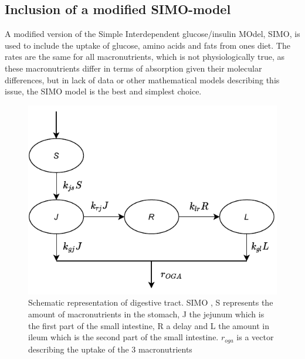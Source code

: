\documentclass{IEEEtran}
\begin{document}

\subsection{Inclusion of a modified SIMO-model}  


A modified version of the Simple Interdependent glucose/insulin MOdel, SIMO, \cite{panunzi_pompa_borri_piemonte_gaetano_2020} is used to include the uptake of glucose, amino acids and fats from ones diet. The rates are the same for all macronutrients, which is not physiologically true, as these macronutrients differ in terms of absorption given their molecular differences, but in lack of data or other mathematical models describing this issue, the SIMO model is the best and simplest choice. \\

\begin{figure}[H]
    \centering
    \includegraphics[width=0.75\columnwidth]{Diagrams/SIMO.pdf}
    \caption{Schematic representation of digestive tract. SIMO \cite{panunzi_pompa_borri_piemonte_gaetano_2020}, S represents the amount of macronutrients in the stomach, J the jejunum which is the first part of the small intestine, R a delay and L the amount in ileum which is the second part of the small intestine. $r_{oga}$ is a vector describing the uptake of the 3 macronutrients}
    \label{fig:simo}
\end{figure}
\end{document}
